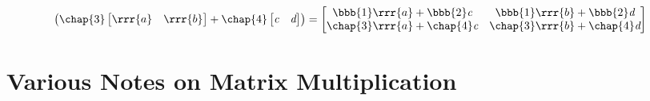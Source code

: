 \begin{itemize}
\begin{itemize}
\[\begin{pmatrix}
    \chap{3} \begin{bmatrix} \rrr{a} & \rrr{b} \end{bmatrix} + 
    \chap{4} \begin{bmatrix} \emph{c} & \emph{d} \end{bmatrix}
    \end{pmatrix}
    =
    \begin{bmatrix}
      \bbb{1}\rrr{a} + \bbb{2}\emph{c} & \bbb{1}\rrr{b}+\bbb{2}\emph{d} \\ \chap{3}\rrr{a}+\chap{4}\emph{c} & \chap{3}\rrr{b}+\chap{4}\emph{d} 
    \end{bmatrix}
  \]%
  \end{itemize}
\end{itemize}

\section{Various Notes on Matrix Multiplication}\label{Applications of Matrix Multiplication}
